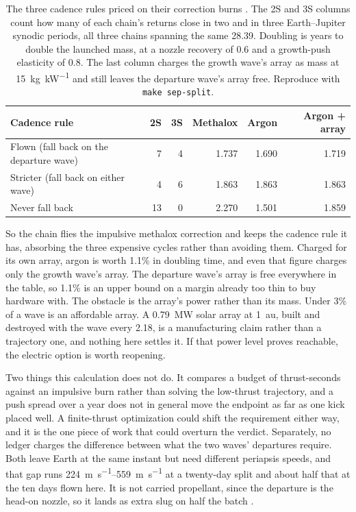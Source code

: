 \documentclass{article}
\begin{document}
\begin{table}[!htpb]
    \centering
    \caption{The three cadence rules priced on their correction burns \cite{Katz_aim_is_all_you_need_2025}. The 2S and 3S columns count how many of each chain's returns close in two and in three Earth--Jupiter synodic periods, all three chains spanning the same \SI{28.39}{\year}. Doubling is years to double the launched mass, at a nozzle recovery of 0.6 and a growth-push elasticity of 0.8. The last column charges the growth wave's array as mass at \SI{15}{\kilo\gram\per\kilo\watt} and still leaves the departure wave's array free. Reproduce with \texttt{make sep-split}.}
    \label{tab:cadence_propellant}
    \begin{tabular}{|l|r|r|r|r|r|}\hline
        \textbf{Cadence rule} & \textbf{2S} & \textbf{3S} & \textbf{Methalox} & \textbf{Argon} & \textbf{Argon + array} \\\hline
        Flown (fall back on the departure wave) & 7 & 4 & 1.737 & 1.690 & 1.719 \\\hline
        Stricter (fall back on either wave) & 4 & 6 & 1.863 & 1.863 & 1.863 \\\hline
        Never fall back & 13 & 0 & 2.270 & 1.501 & 1.859 \\\hline
    \end{tabular}
\end{table}

So the chain flies the impulsive methalox correction and keeps the cadence rule it has, absorbing the three expensive cycles rather than avoiding them. Charged for its own array, argon is worth 1.1\% in doubling time, and even that figure charges only the growth wave's array. The departure wave's array is free everywhere in the table, so 1.1\% is an upper bound on a margin already too thin to buy hardware with. The obstacle is the array's power rather than its mass. Under 3\% of a wave is an affordable array. A \SI{0.79}{\mega\watt} solar array at \SI{1}{\astronomicalunit}, built and destroyed with the wave every \SI{2.18}{\year}, is a manufacturing claim rather than a trajectory one, and nothing here settles it. If that power level proves reachable, the electric option is worth reopening.

Two things this calculation does not do. It compares a budget of thrust-seconds against an impulsive burn rather than solving the low-thrust trajectory, and a push spread over a year does not in general move the endpoint as far as one kick placed well. A finite-thrust optimization could shift the requirement either way, and it is the one piece of work that could overturn the verdict. Separately, no ledger charges the difference between what the two waves' departures require. Both leave Earth at the same instant but need different periapsis speeds, and that gap runs \SIrange{224}{559}{\meter\per\second} at a twenty-day split and about half that at the ten days flown here. It is not carried propellant, since the departure is the head-on nozzle, so it lands as extra slug on half the batch \cite{Katz_aim_is_all_you_need_2025}.
\end{document}
